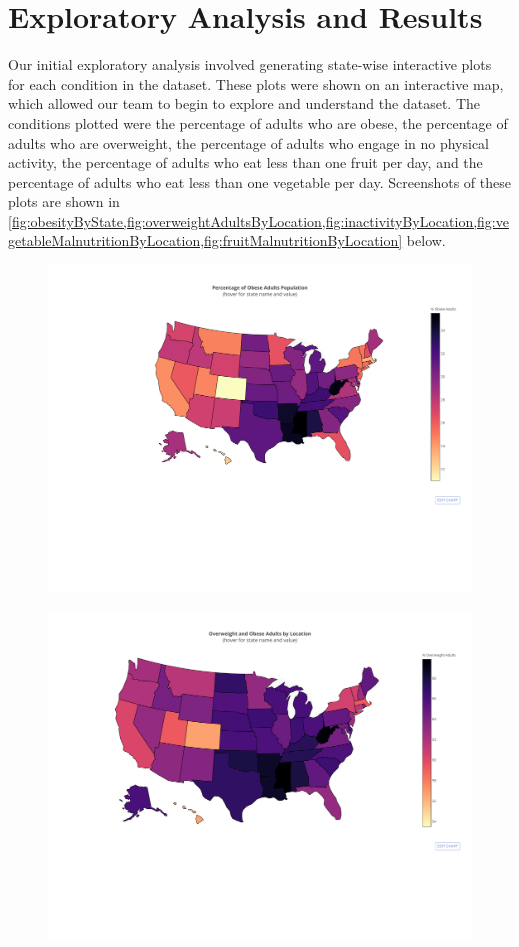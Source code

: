 \documentclass{article}
\begin{document}
\section{Exploratory Analysis and Results}
\label{results}
Our initial exploratory analysis involved generating state-wise interactive plots for each condition in the dataset. These plots were shown on an interactive map, which allowed our team to begin to explore and understand the dataset. The conditions plotted were the percentage of adults who are obese, the percentage of adults who are overweight, the percentage of adults who engage in no physical activity, the percentage of adults who eat less than one fruit per day, and the percentage of adults who eat less than one vegetable per day. Screenshots of these plots are shown in \cref{fig:obesityByState,fig:overweightAdultsByLocation,fig:inactivityByLocation,fig:vegetableMalnutritionByLocation,fig:fruitMalnutritionByLocation} below. 
\begin{figure}[h]
\centering
\caption{}
\includegraphics[width=\linewidth]{images/exploration_d3_map_obese_adults.pdf}
\label{fig:obesityByState}
\end{figure}
\begin{figure}[h]
\centering
\caption{}
\includegraphics[width=\linewidth]{images/exploration_d3_map_overweight_adults.pdf}
\label{fig:overweightAdultsByLocation}
\end{figure}
\end{document}

